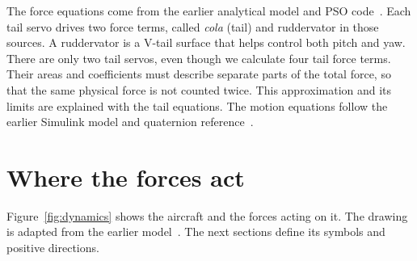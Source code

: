 \documentclass[11pt,a4paper]{article}
\numberwithin{equation}{section}
\begin{document}
The force equations come from the earlier analytical model and PSO
code~\cite{analytical,pso,indices}. Each tail servo drives two force terms,
called \emph{cola} (tail) and ruddervator in those sources. A ruddervator is
a V-tail surface that helps control both pitch and yaw. There are only two
tail servos, even though we calculate four tail force terms. Their areas and
coefficients must describe separate parts of the total force, so that the
same physical force is not counted twice. This approximation and its limits
are explained with the tail equations. The motion equations follow the
earlier Simulink model and quaternion reference~\cite{simulink,thesis}.

\clearpage
\section{Where the forces act}
Figure~\ref{fig:dynamics} shows the aircraft and the forces acting on it.
The drawing is adapted from the earlier model~\cite{analytical}.
The next sections define its symbols and positive directions.
\end{document}
